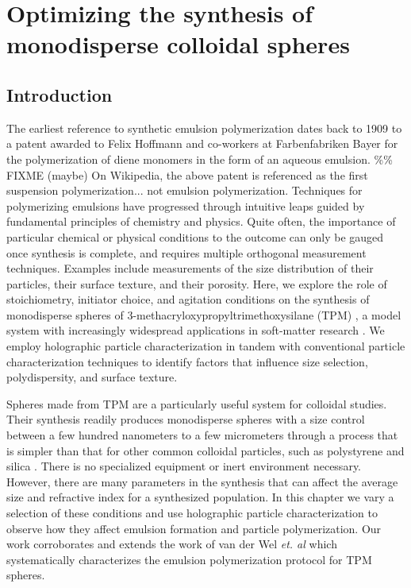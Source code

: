 \chapter{Optimizing the synthesis of monodisperse colloidal spheres}
\label{ch:synthesis}

\section{Introduction}

The earliest reference to synthetic emulsion polymerization dates back to
1909 \cite{bayer1909,finch03} to a patent awarded to Felix Hoffmann and
co-workers at Farbenfabriken Bayer for the polymerization of diene monomers
in the form of an aqueous emulsion.
\%\% FIXME (maybe) On Wikipedia, the above patent is referenced as the first
suspension polymerization... not emulsion polymerization. 
Techniques for polymerizing emulsions have progressed through
intuitive leaps guided by fundamental principles of chemistry
and physics.  Quite often, the importance of particular chemical
or physical conditions to the outcome can only be gauged once
synthesis is complete, and requires multiple orthogonal measurement
techniques. Examples include measurements of the size distribution
of their particles, their surface texture, and their porosity.
Here, we explore the role of stoichiometry, initiator choice, and
agitation conditions on the synthesis of monodisperse spheres of
\num{3}-methacryloxypropyltrimethoxysilane (TPM) \cite{vanderwel17},
a model system with increasingly widespread applications
in soft-matter research \cite{sacanna11,liu16,vanderwel18}.
We employ holographic particle characterization
in tandem with conventional particle characterization
techniques to identify factors that 
influence size selection, polydispersity, and surface texture.

Spheres made from TPM are a particularly useful system for colloidal studies.
Their synthesis readily produces monodisperse spheres with a size control
between a few hundred nanometers to a few micrometers \cite{liu16} through a process 
that is simpler than that for other common colloidal particles, such 
as polystyrene \cite{goodwin1974} and silica \cite{stober68}. There is no specialized 
equipment or inert environment necessary. However, there are many 
parameters in the synthesis that can affect the average size and refractive
index for a synthesized population. In this chapter we vary a selection of these
conditions and use holographic particle characterization to observe how they affect
emulsion formation and particle polymerization. Our work corroborates and extends
the work of van der Wel \emph{et. al} \cite{vanderwel17} which systematically
characterizes the emulsion polymerization protocol for TPM spheres.

